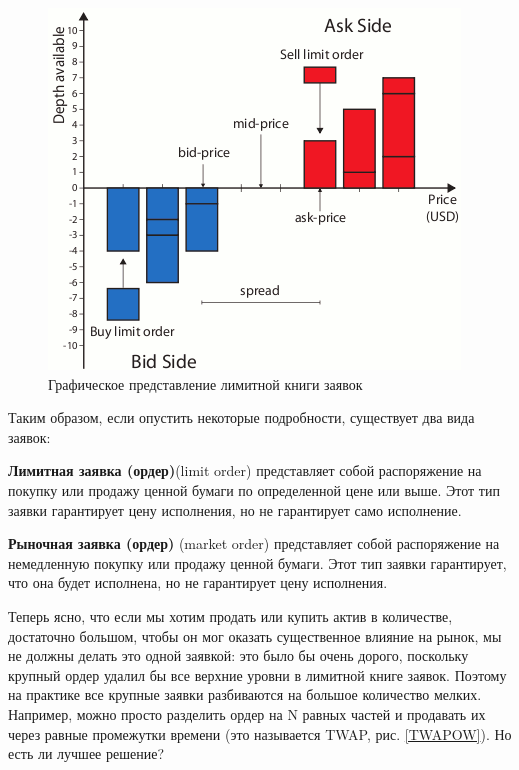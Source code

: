\begin{figure}
    \includegraphics[scale=0.8]{fig/Graphical-representation-of-the-Limit-Order-Book.png}
    \caption{Графическое представление лимитной книги заявок}
    \label{LOBpic}
\end{figure}



Таким образом, если опустить некоторые подробности, существует два вида заявок:
\begin{definition}
    \textbf{Лимитная заявка (ордер)}(limit order) представляет собой распоряжение на покупку или продажу ценной бумаги по определенной цене или выше. 
    Этот тип заявки гарантирует цену исполнения, но не гарантирует само исполнение.
\end{definition}
\begin{definition}
    \textbf{Рыночная заявка (ордер)} (market order) представляет собой распоряжение на немедленную покупку или продажу ценной бумаги. 
    Этот тип заявки гарантирует, что она будет исполнена, но не гарантирует цену исполнения.
\end{definition}


Теперь ясно, что если мы хотим продать или купить актив в количестве, достаточно большом, чтобы он мог оказать существенное
влияние на рынок, мы не должны делать это одной заявкой: это было бы очень дорого, поскольку крупный ордер
удалил бы все верхние уровни в лимитной книге заявок. Поэтому на практике все крупные заявки разбиваются на большое количество мелких.
Например, можно просто разделить ордер на N равных частей и продавать их через равные промежутки времени (это называется TWAP, рис. \ref{TWAPOW}).
Но есть ли лучшее решение?

